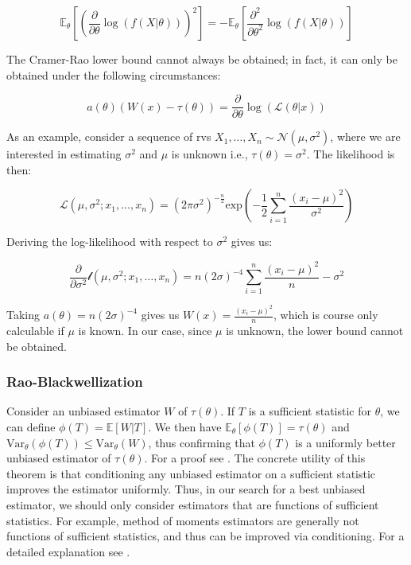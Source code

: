 \documentclass{report}
\begin{document}
\begin{equation}\label{eq:fisher-information}
    \mathbb{E}_\theta\left[\left(\frac{\partial}{\partial\theta}\log(f(X|\theta))\right)^2\right] = -\mathbb{E}_\theta\left[\frac{\partial^2}{\partial\theta^2} \log(f(X|\theta))\right]
\end{equation}

The Cramer-Rao lower bound cannot always be obtained; in fact, it can only be obtained under the following circumstances:

\begin{equation}\label{eq:cramer-rao-attainment}
    a(\theta) \left(W(x) - \tau(\theta)\right) = \frac{\partial}{\partial\theta} \log\left(\mathcal{L}(\theta|x)\right)
\end{equation}

As an example, consider a sequence of \glspl{rv} $X_1, \dots, X_n \sim \mathcal{N}(\mu, \sigma^2)$, where we are interested in estimating $\sigma^2$ and $\mu$ is unknown i.e., $\tau(\theta) = \sigma^2$. The likelihood is then:

\begin{equation}\label{eq:normal-likelihood}
    \mathcal{L}(\mu, \sigma^2; x_1, \dots, x_n) = (2\pi\sigma^2)^{-\frac{n}{2}} \text{exp}\left(-\frac{1}{2}\sum_{i=1}^n \frac{(x_i - \mu)^2}{\sigma^2}\right)
\end{equation}

Deriving the log-likelihood with respect to $\sigma^2$ gives us:

\begin{equation}\label{eq:normal-log-likelihood-derived}
    \frac{\partial}{\partial\sigma^2} \mathcal{l}(\mu, \sigma^2; x_1, \dots, x_n) = n(2\sigma)^{-4} \sum_{i=1}^n \frac{(x_i - \mu)^2}{n} - \sigma^2
\end{equation}

Taking $a(\theta) = n(2\sigma)^{-4}$ gives us $W(x) = \frac{(x_i - \mu)^2}{n}$, which is course only calculable if $\mu$ is known. In our case, since $\mu$ is unknown, the lower bound cannot be obtained. 

\subsubsection{Rao-Blackwellization}

Consider an unbiased estimator $W$ of $\tau(\theta)$. If $T$ is a sufficient statistic for $\theta$, we can define $\phi(T) = \mathbb{E}[W|T]$. We then have $\mathbb{E}_\theta[\phi(T)] = \tau(\theta)$ and $\text{Var}_\theta(\phi(T)) \leq \text{Var}_\theta(W)$, thus confirming that $\phi(T)$ is a uniformly better unbiased estimator of $\tau(\theta)$. For a proof see \cite[Chapter~7.3.3]{casella_statistical_2002}. The concrete utility of this theorem is that conditioning any unbiased estimator on a sufficient statistic improves the estimator uniformly. Thus, in our search for a best unbiased estimator, we should only consider estimators that are functions of sufficient statistics. For example, method of moments estimators are generally not functions of sufficient statistics, and thus can be improved via conditioning. For a detailed explanation see \cite[Chapter~7.5.1]{casella_statistical_2002}.
\end{document}
